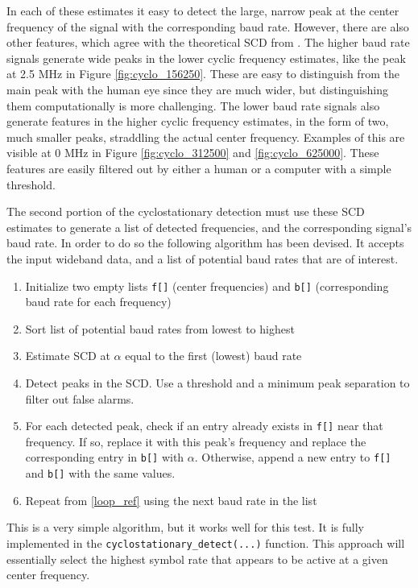 \documentclass[12pt]{report}
\begin{document}
In each of these estimates it easy to detect the large, narrow peak at the
center frequency of the signal with the corresponding baud rate. However, there
are also other features, which agree with the theoretical SCD from
\cite{Gardner2}.  The higher baud rate signals generate wide peaks in the lower
cyclic frequency estimates, like the peak at 2.5 MHz in Figure
\ref{fig:cyclo_156250}. These are easy to distinguish from the main peak with
the human eye since they are much wider, but distinguishing them computationally
is more challenging. The lower baud rate signals also generate features in the
higher cyclic frequency estimates, in the form of two, much smaller peaks,
straddling the actual center frequency. Examples of this are visible at 0 MHz
in Figure \ref{fig:cyclo_312500} and \ref{fig:cyclo_625000}. These features are
easily filtered out by either a human or a computer with a simple threshold.

The second portion of the cyclostationary detection must use these SCD estimates to 
generate a list of detected frequencies, and the corresponding signal's
baud rate. In order to do so the following algorithm has been devised. It accepts the input wideband data, and a list of potential baud rates that are of interest.

\begin{enumerate}
    \item Initialize two empty lists \texttt{f[]} (center frequencies) and \texttt{b[]} (corresponding baud rate for each frequency)
    \item Sort list of potential baud rates from lowest to highest
    \item Estimate SCD at $\alpha$ equal to the first (lowest) baud rate
    \label{loop_ref}
    \item Detect peaks in the SCD. Use a threshold and a minimum peak separation
        to filter out false alarms.
    \item For each detected peak, check if an entry already exists in
        \texttt{f[]} near that frequency. If so, replace it with this peak's
        frequency and replace the corresponding entry in \texttt{b[]} with
        $\alpha$. Otherwise, append a new entry to \texttt{f[]} and
        \texttt{b[]} with the same values.
    \item Repeat from \ref{loop_ref} using the next baud rate in the list
\end{enumerate}

This is a very simple algorithm, but it works well for this test. It is
fully implemented in the \texttt{cyclostationary\_detect(...)} function. This approach will essentially select the highest symbol rate that appears to be active at a given center frequency.
\end{document}
